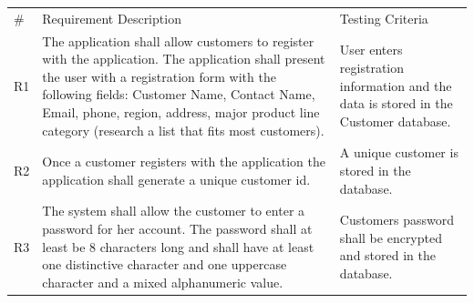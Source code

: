 \documentclass[12pt]{article}
\begin{document}
\begin{myspace}{1.7}
\begin{table}[]
\centering
\label{my-label}
\begin{tabular}{| p{.5cm}|p{9cm} |p{5cm}|}
\#  & Requirement Description                                                                                                                                                                                                                                                                                & Testing Criteria                                                                                                                                                                                                                                                               \\
R1  & The application shall allow customers to register with the application. The application shall present the user with a registration form with the following fields: Customer Name, Contact Name, Email, phone, region, address, major product line category (research a list that fits most customers). & User enters registration information and the data is stored in the Customer database.                                                                                                                                                                                        \\
R2  & Once a customer registers with the application the application shall generate a unique customer id.                                                                                                                                                                                                    & A unique customer is stored in the database.                                                                                                                                                                                                                                 \\
R3  & The system shall allow the customer to enter a password for her account. The password shall at least be 8 characters long and shall have at least one distinctive character and one uppercase character and a mixed alphanumeric value.                                                                & Customers password shall be encrypted and stored in the database.                                                                                                                                                                                                            \\

\end{tabular}
\end{table}
\end{myspace}
\end{document}
